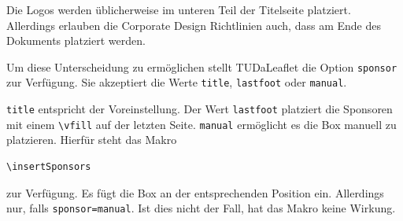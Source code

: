 \documentclass[
	ngerman,%
	accentcolor=9c,%
]{tudaleaflet}
\begin{document}
Die Logos werden üblicherweise im unteren Teil der Titelseite platziert. Allerdings erlauben die Corporate Design Richtlinien auch, dass am Ende des Dokuments platziert werden.

Um diese Unterscheidung zu ermöglichen stellt TUDaLeaflet die Option \verb+sponsor+ zur Verfügung. Sie akzeptiert die Werte \verb+title+, \verb+lastfoot+ oder \verb+manual+.

\verb+title+ entspricht der Voreinstellung. Der Wert \verb+lastfoot+ platziert die Sponsoren mit einem \verb+\vfill+ auf der letzten Seite. \verb+manual+ ermöglicht es die Box manuell zu platzieren. Hierfür steht das Makro
\begin{verbatim}
\insertSponsors
\end{verbatim}
zur Verfügung. Es fügt die Box an der entsprechenden Position ein. Allerdings nur, falls \verb+sponsor=manual+. Ist dies nicht der Fall, hat das Makro keine Wirkung.


\printbibliography
\end{document}
